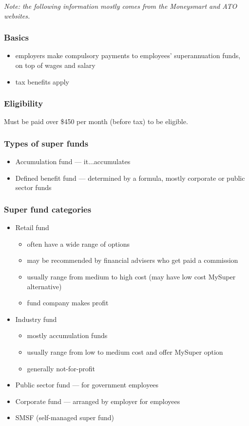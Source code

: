 \textit{Note: the following information mostly comes from the Moneysmart \cite{moneysmart_super} and ATO \cite{ato_super} websites.}

\subsubsection{Basics}
\begin{itemize}
	\item employers make compulsory payments to employees' superannuation funds, on top of wages and salary
	\item tax benefits apply
\end{itemize}

\subsubsection{Eligibility}
Must be paid over \$450 per month (before tax) to be eligible.

\subsubsection{Types of super funds}
\begin{itemize}
	\item Accumulation fund --- it...accumulates
	\item Defined benefit fund --- determined by a formula, mostly corporate or public sector funds
\end{itemize}

\subsubsection{Super fund categories}
\begin{itemize}
	\item Retail fund
	\begin{itemize}
		\item often have a wide range of options
		\item may be recommended by financial advisers who get paid a commission
		\item usually range from medium to high cost (may have low cost MySuper alternative)
		\item fund company makes profit
	\end{itemize}
	\item Industry fund
	\begin{itemize}
		\item mostly accumulation funds
		\item usually range from low to medium cost and offer MySuper option
		\item generally not-for-profit
	\end{itemize}
	\item Public sector fund --- for government employees
 	\item Corporate fund --- arranged by employer for employees
	\item SMSF (self-managed super fund)
\end{itemize}

